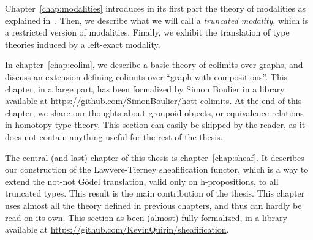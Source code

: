Chapter~\ref{chap:modalities} introduces in its first part the theory
of modalities as explained in~\cite{hottbook}. Then, we describe what
we will call a {\em truncated modality}, which is a restricted version
of modalities. Finally, we exhibit the translation of type theories
induced by a left-exact modality.

In chapter~\ref{chap:colim}, we describe a basic theory of colimits
over graphs, and discuss an extension defining colimits over ``graph
with compositions''. This chapter, in a large part, has been
formalized by Simon Boulier in a library available at
\url{https://github.com/SimonBoulier/hott-colimits}. At the end of
this chapter, we share our thoughts about groupoid objects, or
equivalence relations in homotopy type theory. This section can easily
be skipped by the reader, as it does not contain anything useful for
the rest of the thesis.

The central (and last) chapter of this thesis is
chapter~\ref{chap:sheaf}. It describes our construction of the
Lawvere-Tierney sheafification functor, which is a way to extend the
not-not Gödel translation, valid only on h-propositions, to all
truncated types. This result is the main contribution of the thesis.
This chapter uses almost all the theory defined in
previous chapters, and thus can hardly be read on its own. This
section as been (almost) fully formalized, in a library available at
\url{https://github.com/KevinQuirin/sheafification}.


